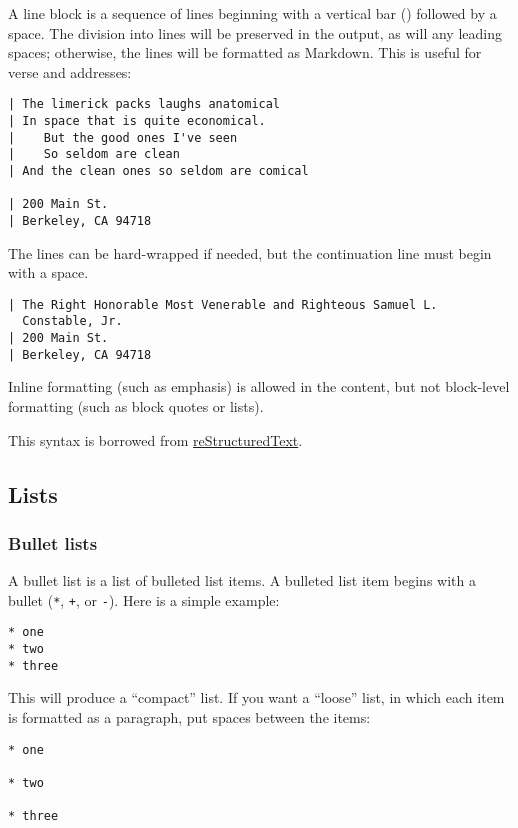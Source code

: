 A line block is a sequence of lines beginning with a vertical bar
(\texttt{\textbar{}}) followed by a space. The division into lines will
be preserved in the output, as will any leading spaces; otherwise, the
lines will be formatted as Markdown. This is useful for verse and
addresses:

\begin{verbatim}
| The limerick packs laughs anatomical
| In space that is quite economical.
|    But the good ones I've seen
|    So seldom are clean
| And the clean ones so seldom are comical

| 200 Main St.
| Berkeley, CA 94718
\end{verbatim}

The lines can be hard-wrapped if needed, but the continuation line must
begin with a space.

\begin{verbatim}
| The Right Honorable Most Venerable and Righteous Samuel L.
  Constable, Jr.
| 200 Main St.
| Berkeley, CA 94718
\end{verbatim}

Inline formatting (such as emphasis) is allowed in the content, but not
block-level formatting (such as block quotes or lists).

This syntax is borrowed from
\href{https://docutils.sourceforge.io/docs/ref/rst/introduction.html}{reStructuredText}.

\hypertarget{lists}{%
\subsection{Lists}\label{lists}}

\hypertarget{bullet-lists}{%
\subsubsection{Bullet lists}\label{bullet-lists}}

A bullet list is a list of bulleted list items. A bulleted list item
begins with a bullet (\texttt{*}, \texttt{+}, or \texttt{-}). Here is a
simple example:

\begin{verbatim}
* one
* two
* three
\end{verbatim}

This will produce a ``compact'' list. If you want a ``loose'' list, in
which each item is formatted as a paragraph, put spaces between the
items:

\begin{verbatim}
* one

* two

* three
\end{verbatim}

